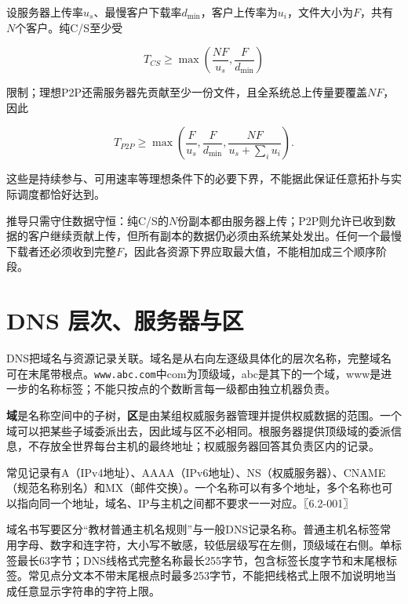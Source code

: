 \begin{methodbox}[文件分发先求不可突破的下界]

设服务器上传率\(u_s\)、最慢客户下载率\(d_{\min}\)，客户上传率为\(u_i\)，文件大小为\(F\)，共有\(N\)个客户。纯C/S至少受

\[T_{CS}\ge\max\left(\frac{NF}{u_s},\frac F{d_{\min}}\right)\]

限制；理想P2P还需服务器先贡献至少一份文件，且全系统总上传量要覆盖\(NF\)，因此

\[T_{P2P}\ge\max\left(\frac F{u_s},\frac F{d_{\min}},\frac{NF}{u_s+\sum_i u_i}\right).\]

这些是持续参与、可用速率等理想条件下的必要下界，不能据此保证任意拓扑与实际调度都恰好达到。

\end{methodbox}

推导只需守住数据守恒：纯C/S的\(N\)份副本都由服务器上传；P2P则允许已收到数据的客户继续贡献上传，但所有副本的数据仍必须由系统某处发出。任何一个最慢下载者还必须收到完整\(F\)，因此各资源下界应取最大值，不能相加成三个顺序阶段。

\section{DNS 层次、服务器与区}\label{CN06-02}

DNS把域名与资源记录关联。域名是从右向左逐级具体化的层次名称，完整域名可在末尾带根点。\texttt{www.abc.com}中com为顶级域，abc是其下的一个域，www是进一步的名称标签；不能只按点的个数断言每一级都由独立机器负责。

\begin{definition}[域与权威区]

\textbf{域}是名称空间中的子树，\textbf{区}是由某组权威服务器管理并提供权威数据的范围。一个域可以把某些子域委派出去，因此域与区不必相同。根服务器提供顶级域的委派信息，不存放全世界每台主机的最终地址；权威服务器回答其负责区内的记录。

\end{definition}

常见记录有A（IPv4地址）、AAAA（IPv6地址）、NS（权威服务器）、CNAME（规范名称别名）和MX（邮件交换）。一个名称可以有多个地址，多个名称也可以指向同一个地址，域名、IP与主机之间都不要求一一对应。〖6.2-001〗

域名书写要区分``教材普通主机名规则''与一般DNS记录名称。普通主机名标签常用字母、数字和连字符，大小写不敏感，较低层级写在左侧，顶级域在右侧。单标签最长63字节；DNS线格式完整名称最长255字节，包含标签长度字节和末尾根标签。常见点分文本不带末尾根点时最多253字节，不能把线格式上限不加说明地当成任意显示字符串的字符上限。

